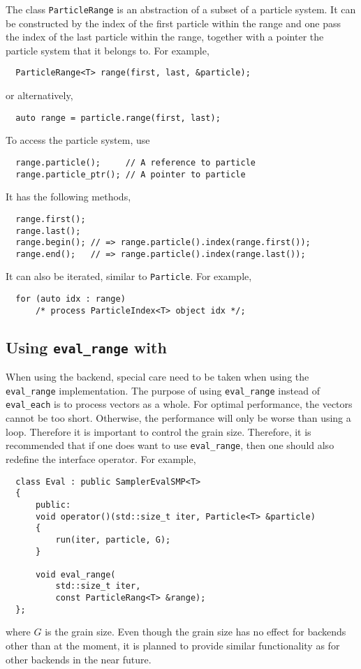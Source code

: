 The class \verb|ParticleRange| is an abstraction of a subset of a particle
system. It can be constructed by the index of the first particle within the
range and one pass the index of the last particle within the range, together
with a pointer the particle system that it belongs to. For example,
\begin{Verbatim}
  ParticleRange<T> range(first, last, &particle);
\end{Verbatim}
or alternatively,
\begin{Verbatim}
  auto range = particle.range(first, last);
\end{Verbatim}
To access the particle system, use
\begin{Verbatim}
  range.particle();     // A reference to particle
  range.particle_ptr(); // A pointer to particle
\end{Verbatim}
It has the following methods, 
\begin{Verbatim}
  range.first();
  range.last();
  range.begin(); // => range.particle().index(range.first());
  range.end();   // => range.particle().index(range.last());
\end{Verbatim}
It can also be iterated, similar to \verb|Particle|. For example,
\begin{Verbatim}
  for (auto idx : range)
      /* process ParticleIndex<T> object idx */;
\end{Verbatim}

\subsection{Using \texttt{eval\_range} with \tbb}

When using the \tbb backend, special care need to be taken when using the
\verb|eval_range| implementation. The purpose of using \verb|eval_range|
instead of \verb|eval_each| is to process vectors as a whole. For optimal
performance, the vectors cannot be too short. Otherwise, the performance will
only be worse than using a loop. Therefore it is important to control the grain
size. Therefore, it is recommended that if one does want to use
\verb|eval_range|, then one should also redefine the interface operator. For
example,
\begin{Verbatim}
  class Eval : public SamplerEvalSMP<T>
  {
      public:
      void operator()(std::size_t iter, Particle<T> &particle)
      {
          run(iter, particle, G);
      }

      void eval_range(
          std::size_t iter,
          const ParticleRang<T> &range);
  };
\end{Verbatim}
where $G$ is the grain size. Even though the grain size has no effect for
backends other than \tbb at the moment, it is planned to provide similar
functionality as \tbb for other backends in the near future.

